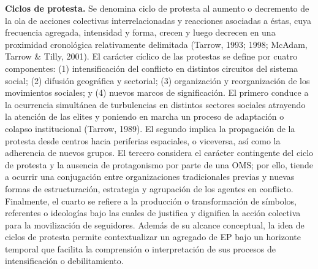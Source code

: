 \documentclass[letterpaper, 11pt]{book}
\theoremstyle{definition}
\theoremstyle{remark}
\begin{document}
{{{{\textbf{Ciclos de protesta.} \small{Se denomina ciclo de protesta al aumento o decremento de la ola de acciones colectivas interrelacionadas y reacciones asociadas a éstas, cuya frecuencia agregada, intensidad y forma, crecen y luego decrecen en una proximidad cronológica relativamente delimitada (Tarrow, 1993; 1998; McAdam, Tarrow \& Tilly, 2001).
El carácter cíclico de las protestas se define por cuatro componentes: (1) intensificación del conflicto en distintos circuitos del sistema social; (2) difusión geográfica y sectorial; (3) organización y reorganización de los movimientos sociales; y (4) nuevos marcos de significación.
El primero conduce a la ocurrencia simultánea de turbulencias en distintos sectores sociales atrayendo la atención de las elites y poniendo en marcha un proceso de adaptación o colapso institucional (Tarrow, 1989).
El segundo implica la propagación de la protesta desde centros hacia periferias espaciales, o viceversa, así como la adherencia de nuevos grupos.
El tercero considera el carácter contingente del ciclo de protesta y la ausencia de protagonismo por parte de una OMS; por ello, tiende a ocurrir una conjugación entre organizaciones tradicionales previas y nuevas formas de estructuración, estrategia y agrupación de los agentes en conflicto.
Finalmente, el cuarto se refiere a la producción o transformación de símbolos, referentes o ideologías bajo las cuales de justifica y dignifica la acción colectiva para la movilización de seguidores.
Además de su alcance conceptual, la idea de ciclos de protesta permite contextualizar un agregado de EP bajo un horizonte temporal que facilita la comprensión o interpretación de sus procesos de intensificación o debilitamiento.}\vspace{1em}



}}}}
\end{document}
